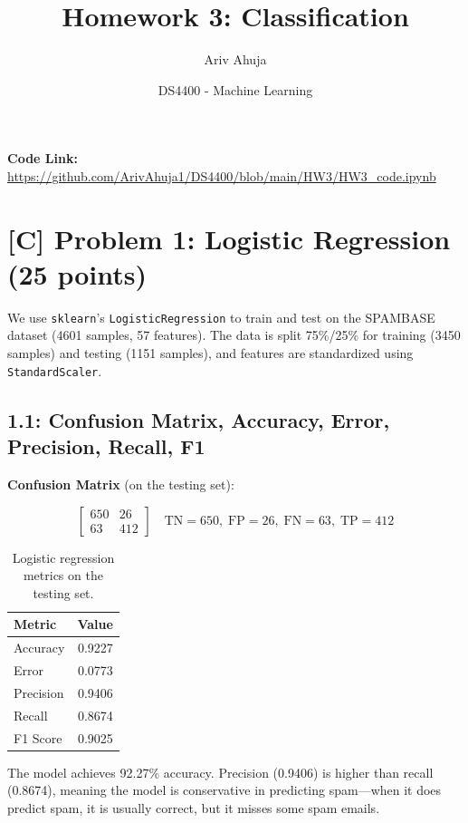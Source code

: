 \documentclass[11pt]{article}
\title{\textbf{Homework 3: Classification}}
\author{Ariv Ahuja}
\date{DS4400 - Machine Learning}
\begin{document}
\maketitle

\noindent\textbf{Code Link:} \url{https://github.com/ArivAhuja1/DS4400/blob/main/HW3/HW3_code.ipynb}

\section*{[C] Problem 1: Logistic Regression (25 points)}

We use \texttt{sklearn}'s \texttt{LogisticRegression} to train and test on the SPAMBASE dataset (4601 samples, 57 features). The data is split 75\%/25\% for training (3450 samples) and testing (1151 samples), and features are standardized using \texttt{StandardScaler}.

\subsection*{1.1: Confusion Matrix, Accuracy, Error, Precision, Recall, F1}

\noindent\textbf{Confusion Matrix} (on the testing set):

\[
\begin{bmatrix}
650 & 26 \\
63 & 412
\end{bmatrix}
\quad
\text{TN}=650,\; \text{FP}=26,\; \text{FN}=63,\; \text{TP}=412
\]

\begin{table}[h]
\centering
\begin{tabular}{lr}
\toprule
\textbf{Metric} & \textbf{Value} \\
\midrule
Accuracy  & 0.9227 \\
Error     & 0.0773 \\
Precision & 0.9406 \\
Recall    & 0.8674 \\
F1 Score  & 0.9025 \\
\bottomrule
\end{tabular}
\caption{Logistic regression metrics on the testing set.}
\end{table}

The model achieves 92.27\% accuracy. Precision (0.9406) is higher than recall (0.8674), meaning the model is conservative in predicting spam---when it does predict spam, it is usually correct, but it misses some spam emails.
\end{document}
